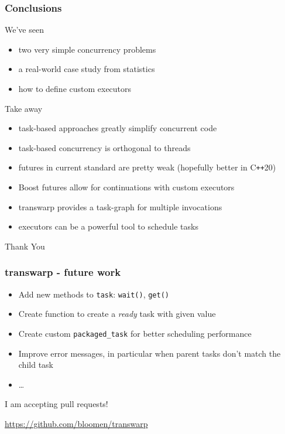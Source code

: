 \documentclass[12pt,aspectratio=169]{beamer}
\begin{document}
\begin{frame}[fragile]
\frametitle{Conclusions}
We've seen
\begin{itemize}
\item two very simple concurrency problems
\item a real-world case study from statistics
\item how to define custom executors
\end{itemize}
\bigskip

Take away
\begin{itemize}
\item task-based approaches greatly simplify concurrent code
\item task-based concurrency is orthogonal to threads
\item futures in current standard are pretty weak (hopefully better in C\texttt{++}20)
\item Boost futures allow for continuations with custom executors
\item transwarp provides a task-graph for multiple invocations
\item executors can be a powerful tool to schedule tasks
\end{itemize}
\end{frame}

\begin{frame}[fragile]
\huge
\begin{center}
Thank You
\end{center}
\end{frame}

\begin{frame}[fragile]
\frametitle{transwarp - future work}
\begin{itemize}
\item Add new methods to \lstinline{task}: \lstinline{wait()}, \lstinline{get()}
\item Create function to create a \textit{ready} task with given value
\item Create custom \lstinline{packaged_task} for better scheduling performance
\item Improve error messages, in particular when parent tasks don't match the child task
\item \ldots
\end{itemize}
\bigskip
\bigskip
I am accepting pull requests!
\bigskip

\url{https://github.com/bloomen/transwarp}
\bigskip

\end{frame}
\end{document}
